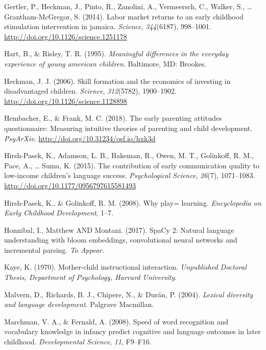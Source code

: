 \documentclass[]{article}
\begin{document}
\leavevmode\hypertarget{ref-Jamaica2014}{}%
Gertler, P., Heckman, J., Pinto, R., Zanolini, A., Vermeersch, C.,
Walker, S., \ldots{} Grantham-McGregor, S. (2014). Labor market returns
to an early childhood stimulation intervention in jamaica.
\emph{Science}, \emph{344}(6187), 998--1001.
\url{http://doi.org/10.1126/science.1251178}

\leavevmode\hypertarget{ref-Hart1995}{}%
Hart, B., \& Risley, T. R. (1995). \emph{Meaningful differences in the
everyday experience of young american children}. Baltimore, MD: Brookes.

\leavevmode\hypertarget{ref-Heckman2006}{}%
Heckman, J. J. (2006). Skill formation and the economics of investing in
disadvantaged children. \emph{Science}, \emph{312}(5782), 1900--1902.
\url{http://doi.org/10.1126/science.1128898}

\leavevmode\hypertarget{ref-Hembacher2018}{}%
Hembacher, E., \& Frank, M. C. (2018). The early parenting attitudes
questionnaire: Measuring intuitive theories of parenting and child
development. \emph{PsyArXiv}. \url{http://doi.org/10.31234/osf.io/hxk3d}

\leavevmode\hypertarget{ref-HirshPasek2015}{}%
Hirsh-Pasek, K., Adamson, L. B., Bakeman, R., Owen, M. T., Golinkoff, R.
M., Pace, A., \ldots{} Suma, K. (2015). The contribution of early
communication quality to low-income children's language success.
\emph{Psychological Science}, \emph{26}(7), 1071--1083.
\url{http://doi.org/10.1177/0956797615581493}

\leavevmode\hypertarget{ref-Hirsh2008}{}%
Hirsh-Pasek, K., \& Golinkoff, R. M. (2008). Why play= learning.
\emph{Encyclopedia on Early Childhood Development}, 1--7.

\leavevmode\hypertarget{ref-spacy2}{}%
Honnibal, I., Matthew AND Montani. (2017). SpaCy 2: Natural language
understanding with bloom embeddings, convolutional neural networks and
incremental parsing. \emph{To Appear}.

\leavevmode\hypertarget{ref-Kaye1970}{}%
Kaye, K. (1970). Mother-child instructional interaction.
\emph{Unpublished Doctoral Thesis, Department of Psychology, Harvard
University}.

\leavevmode\hypertarget{ref-Malvern2004}{}%
Malvern, D., Richards, B. J., Chipere, N., \& Durán, P. (2004).
\emph{Lexical diversity and language development}. Palgrave Macmillan.

\leavevmode\hypertarget{ref-Marchman2008}{}%
Marchman, V. A., \& Fernald, A. (2008). Speed of word recognition and
vocabulary knowledge in infancy predict cognitive and language outcomes
in later childhood. \emph{Developmental Science}, \emph{11}, F9--F16.
\end{document}
